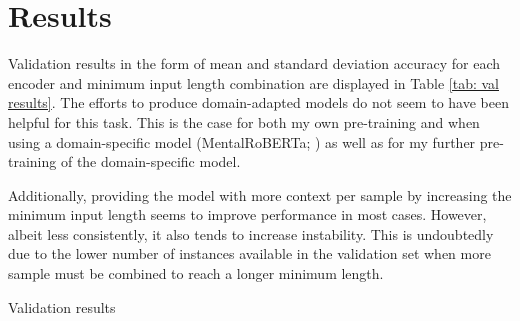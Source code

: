\documentclass[12pt]{report}
\begin{document}
\section{Results}
Validation results in the form of mean and standard deviation accuracy for each encoder and minimum input length combination are displayed in Table \ref{tab: val results}.
The efforts to produce domain-adapted models do not seem to have been helpful for this task.
This is the case for both my own pre-training and when using a domain-specific model (MentalRoBERTa; ) as well as for my further pre-training of the domain-specific model.

Additionally, providing the model with more context per sample by increasing the minimum input length seems to improve performance in most cases.
However, albeit less consistently, it also tends to increase instability.
This is undoubtedly due to the lower number of instances available in the validation set when more sample must be combined to reach a longer minimum length.
\begin{table}
\begin{adjustbox}{width=1\textwidth}
    
\end{adjustbox}
\caption{Validation results}
\label{tab: val results}
\end{table}
\end{document}
